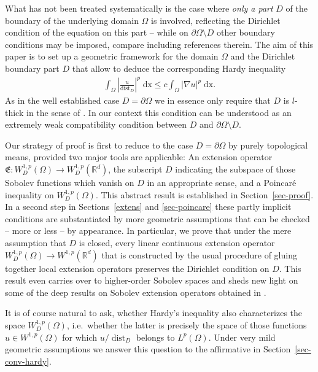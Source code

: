 \documentclass[10pt,leqno]{amsart}
\theoremstyle{definition}
\numberwithin{equation}{section}
\begin{document}
What has not been treated systematically is the case where \emph{only a part}
$D$ of the boundary of the underlying domain $\Omega$ is involved, reflecting
the Dirichlet condition of the equation on this part -- while on $\partial
\Omega \setminus D$ other boundary conditions may be imposed, compare
\cite{ed/kuf,kovarik,aermark,korol,chechkin} including references therein. The
aim of
this paper is to set up a geometric framework for the domain $\Omega$ and the
Dirichlet boundary part $D$ that allow to deduce the corresponding Hardy
inequality
\begin{align*}
 \int_\Omega \left| \frac{u}{{\operatorname{dist}}_D} \right|^p \; {{\mathrm{d}}} \mathrm{x} \le c
	\int_\Omega |\nabla u|^p \; {{\mathrm{d}}} \mathrm{x}.
\end{align*}
As in the well established case $D = \partial \Omega$ we in
essence only require that $D$ is $l$-thick in the sense of \cite{juha}. In
our context this condition can be understood as an extremely weak compatibility
condition between $D$ and $\partial \Omega \setminus D$.

Our strategy of proof is first to reduce to the case $D = \partial \Omega$ by
purely topological means, provided two major tools
are applicable: An extension operator $\mathfrak E : W^{1,p}_D(\Omega) \to
W^{1,p}_D({{\mathbb R}}^d)$, the subscript $D$ indicating the subspace of those Sobolev
functions which vanish on $D$ in an appropriate sense, and a Poincar\'{e}
inequality on $W^{1,p}_D(\Omega)$. This abstract result is established in
Section~\ref{sec-proof}. In a second step in Sections~\ref{extens} and
\ref{sec-poincare} these partly implicit conditions are substantiated by more
geometric assumptions that can be checked -- more or less -- by appearance. In
particular, we prove that under the mere assumption that $D$ is closed, every
linear continuous extension operator $W_D^{1,p}(\Omega) \to W^{1,p}({{\mathbb R}}^d)$ that
is constructed by the usual procedure of gluing together local extension
operators preserves the Dirichlet condition on $D$. This result even carries
over to higher-order Sobolev spaces and sheds new light on some of the deep
results on Sobolev extension operators obtained in \cite{mitrea}. 

It is of course natural to ask, whether Hardy's inequality also
characterizes the space $W^{1,p}_D(\Omega)$, i.e.\ whether the latter is
precisely the space of those functions $u \in W^{1,p}(\Omega)$ for which
$u/{\operatorname{dist}}_D$ belongs to $L^p(\Omega)$. Under very mild geometric assumptions
we answer this question to the affirmative in Section~\ref{sec-conv-hardy}.
\end{document}
